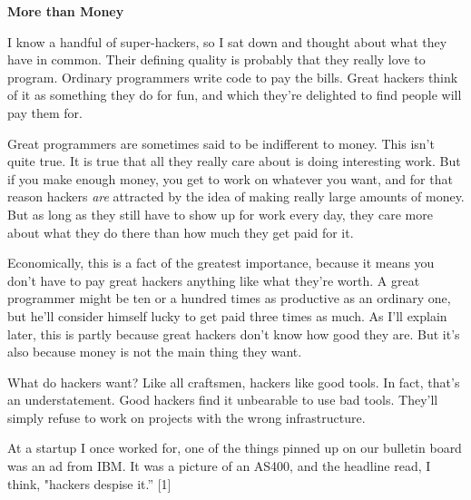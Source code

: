 \textbf{More than Money}

I know a handful of super-hackers, so I sat
                    down and thought about what they have in common. Their
                    defining quality is probably that they really love to
                    program. Ordinary programmers write code to pay the bills.
                    Great hackers think of it as something they do for fun, and
                    which they're delighted to find people will pay them for.

Great
                    programmers are sometimes said to be indifferent to money.
                    This isn't quite true. It is true that all they really care
                    about is doing interesting work. But if you make enough
                    money, you get to work on whatever you want, and for that
                    reason hackers \emph{are} attracted by the idea of making
                    really large amounts of money. But as long as they still
                    have to show up for work every day, they care more about
                    what they do there than how much they get paid for it.

Economically,
                    this is a fact of the greatest importance, because it means
                    you don't have to pay great hackers anything like what
                    they're worth. A great programmer might be ten or a hundred
                    times as productive as an ordinary one, but he'll consider
                    himself lucky to get paid three times as much. As I'll
                    explain later, this is partly because great hackers don't
                    know how good they are. But it's also because money is not
                    the main thing they want.

What do hackers want?
                    Like all craftsmen, hackers like good tools. In fact, that's
                    an understatement. Good hackers find it unbearable to use
                    bad tools. They'll simply refuse to work on projects with
                    the wrong infrastructure.

At a startup I once
                    worked for, one of the things pinned up on our bulletin
                    board was an ad from IBM. It was a picture of an AS400, and
                    the headline read, I think, "hackers despise it.'' [1]

